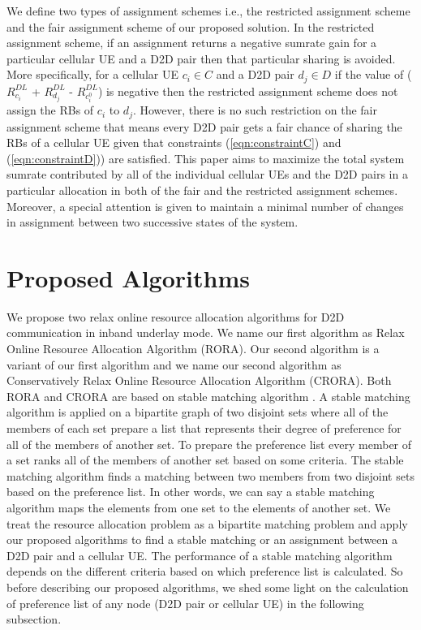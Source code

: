 \documentclass[times]{dacauth}
\begin{document}
\smallskip
\noindent
We define two types of assignment schemes i.e., the restricted assignment scheme and the fair assignment scheme of our proposed solution. In the restricted assignment scheme, if an assignment returns a negative sumrate gain for a particular cellular UE and a D2D pair then that particular sharing is avoided. More specifically, for a cellular UE $c_i \in C$ and a D2D pair $d_j \in D$ if the value of ($R_{c_i}^{DL}$ + $R_{d_j}^{DL}$ - $R_{c_i^0}^{DL}$) is negative then the restricted assignment scheme does not assign the RBs of $c_i$ to $d_j$. However, there is no such restriction on the fair assignment scheme that means every D2D pair gets a fair chance of sharing the RBs of a cellular UE given that constraints (\ref{eqn:constraintC}) and (\ref{eqn:constraintD})) are satisfied. This paper aims to maximize the total system sumrate contributed by all of the individual cellular UEs and the D2D pairs in a particular allocation in both of the fair and the restricted assignment schemes. Moreover, a special attention is given to maintain a minimal number of changes in assignment between two successive states of the system.

\section{Proposed Algorithms}\label{section:Proposed Algorithm}

\noindent
We propose two relax online resource allocation algorithms for D2D communication in inband underlay mode. We name our first algorithm as Relax Online Resource Allocation Algorithm (RORA). Our second algorithm is a variant of our first algorithm and we name our second algorithm as Conservatively Relax Online Resource Allocation Algorithm (CRORA). Both RORA and CRORA are based on stable matching algorithm \cite{knuth1976mariages}. A stable matching algorithm is applied on a bipartite graph of two disjoint sets where all of the members of each set prepare a list that represents their degree of preference for all of the members of another set. To prepare the preference list every member of a set ranks all of the members of another set based on some criteria. The stable matching algorithm finds a matching between two members from two disjoint sets based on the preference list. In other words, we can say a stable matching algorithm maps the elements from one set to the elements of another set. We treat the resource allocation problem as a bipartite matching problem and apply our proposed algorithms to find a stable matching or an assignment between a D2D pair and a cellular UE. The performance of a stable matching algorithm depends on the different criteria based on which preference list is calculated. So before describing our proposed algorithms, we shed some light on the calculation of preference list of any node (D2D pair or cellular UE) in the following subsection.  
\end{document}
